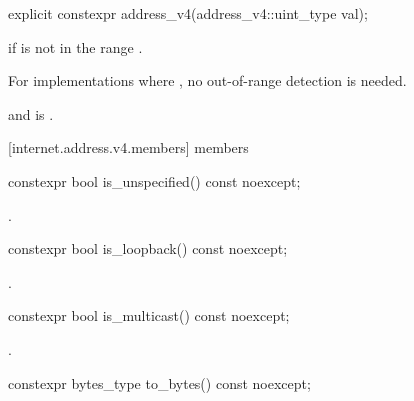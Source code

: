 \begin{itemdecl}
explicit constexpr address_v4(address_v4::uint_type val);
\end{itemdecl}

\begin{itemdescr}
\pnum
\remarks {} if  is not in the range \tcode{[0, 0xFFFFFFFF]}. \begin{note} For implementations where , no out-of-range detection is needed. \end{note}

\pnum
\postconditions {} and  is .
\end{itemdescr}



[internet.address.v4.members]{ members}

%
\begin{itemdecl}
constexpr bool is_unspecified() const noexcept;
\end{itemdecl}

\begin{itemdescr}
\pnum
\returns {}.
\end{itemdescr}

%
\begin{itemdecl}
constexpr bool is_loopback() const noexcept;
\end{itemdecl}

\begin{itemdescr}
\pnum
\returns {}.
\end{itemdescr}

%
\begin{itemdecl}
constexpr bool is_multicast() const noexcept;
\end{itemdecl}

\begin{itemdescr}
\pnum
\returns {}.
\end{itemdescr}

%
\begin{itemdecl}
constexpr bytes_type to_bytes() const noexcept;
\end{itemdecl}

